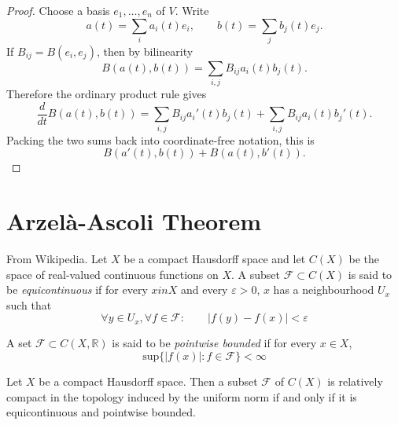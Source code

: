 \begin{proof}
Choose a basis $e_1,\ldots,e_n$ of $V$. Write
$$
a(t)=\sum_i a_i(t)e_i,\qquad
b(t)=\sum_j b_j(t)e_j.
$$
If $B_{ij}=B(e_i,e_j)$, then by bilinearity
$$
B(a(t),b(t))=\sum_{i,j}B_{ij}a_i(t)b_j(t).
$$
Therefore the ordinary product rule gives
$$
\frac{d}{dt}B(a(t),b(t))
=
\sum_{i,j}B_{ij}a_i'(t)b_j(t)
+
\sum_{i,j}B_{ij}a_i(t)b_j'(t).
$$
Packing the two sums back into
coordinate-free notation, this is
$$
B(a'(t),b(t))+B(a(t),b'(t)).
$$
\end{proof}

\section{Arzelà-Ascoli Theorem}
\label{section-Arzela-Ascoli-theorem}
\begin{definition}
\label{definition-equicontinuous}
From Wikipedia. Let $X$ be a compact
Hausdorff space and let  $C(X)$ be the
space of real-valued continuous functions on
$X$. A subset $\mathcal{F} \subset
C(X)$ is said to be {\it equicontinuous} if
for every $x in X$ and every
$\varepsilon>0$, $x$ has a neighbourhood
$U_x$ such that
$$
\forall y \in U_x, \forall f \in \mathcal{F}:
\qquad |f(y)-f(x)|<\varepsilon
$$
\end{definition}

\begin{definition}
\label{definition-pointwise-bounded}
A set $\mathcal{F}\subset C(X,\mathbb{R})$ is
said to be {\it pointwise
bounded} if for every $x \in X$,
$$
\text{sup}\{|f(x)|:f \in \mathcal{F}\}<\infty
$$
\end{definition}

\begin{theorem}
\label{theorem-Arzela-Ascoli}
Let $X$ be a compact Hausdorff space. Then a
subset $\mathcal{F}$ of $C(X)$ is
relatively compact in the topology induced by
the uniform norm if and only if it
is equicontinuous and pointwise bounded.
\end{theorem}





